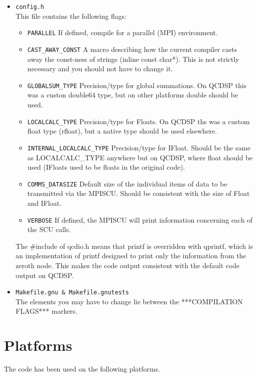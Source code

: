 \documentclass[12pt]{article}
\begin{document}
\begin{itemize}
\item{\tt config.h}\\

This file contains the following flags:
\begin{itemize}
 \item{\tt PARALLEL} If defined, compile for a parallel (MPI) environment.
 \item{\tt CAST\_AWAY\_CONST}  A macro describing how the current compiler casts
                     away the const-ness of strings (inline const
                     char*).  This is not strictly necessary and you
                     should not have to change it.
 \item{\tt GLOBALSUM\_TYPE} Precision/type for global summations.  On QCDSP
 this was a custon double64 type, but on other platforms double should be
 used.
 \item{\tt LOCALCALC\_TYPE} Precision/type for Floats.  On QCDSP ths was a
 custom float type (rfloat), but a native type should be used elsewhere.
 \item{\tt INTERNAL\_LOCALCALC\_TYPE} Precision/type for IFloat.  Should be the
                             same as LOCALCALC\_TYPE anywhere but on
                             QCDSP, where float should be used (IFloats used
			     to be floats in the original code).
 \item{\tt COMMS\_DATASIZE} Default size of the individual items of data to be
                    transmitted via the MPISCU.  Should be consistent
                    with the size of Float and IFloat.
 \item{\tt VERBOSE} If defined, the MPISCU will print information concerning
             each of the SCU calls.
\end{itemize}

The \#include of qcdio.h means that printf is overridden with qprintf,
which is an implementation of printf designed to print only the
information from the zeroth node.  This makes the code output consistent
with the default code output on QCDSP.

\item{\tt Makefile.gnu \& Makefile.gnutests}\\
The elements you may have to change
lie between the ***COMPILATION FLAGS*** markers.  


\end{itemize}



\section{Platforms}
The code has been used on the following platforms.
\end{document}
